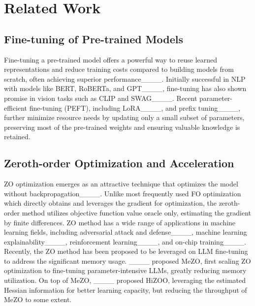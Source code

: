 \section{Related Work}
\subsection{Fine-tuning of Pre-trained Models}


Fine-tuning a pre-trained model offers a powerful way to reuse learned representations and reduce training costs compared to building models from scratch, often achieving superior performance____. Initially successful in NLP with models like BERT, RoBERTa, and GPT____, fine-tuning has also shown promise in vision tasks such as CLIP and SWAG____. Recent parameter-efficient fine-tuning (PEFT), including LoRA____, and prefix tuning____, further minimize resource needs by updating only a small subset of parameters, preserving most of the pre-trained weights and ensuring valuable knowledge is retained.

\subsection{Zeroth-order Optimization and Acceleration}

ZO optimization emerges as an attractive technique that optimizes the model without backpropagation____. Unlike most frequently used FO optimization which directly obtains and leverages the gradient for optimization, the zeroth-order method utilizes objective function value oracle only, estimating the gradient by finite differences.
ZO method has a wide range of applications in machine learning fields, including adversarial attack and defense____, machine learning explainability____, reinforcement learning____, and on-chip training____. 
Recently, the ZO method has been proposed to be leveraged on LLM fine-tuning to address the significant memory usage. ____ proposed MeZO, first scaling ZO optimization to fine-tuning parameter-intensive LLMs, greatly reducing memory utilization. On top of MeZO, ____ proposed HiZOO, leveraging the estimated Hessian information for better learning capacity, but reducing the throughput of MeZO to some extent.


